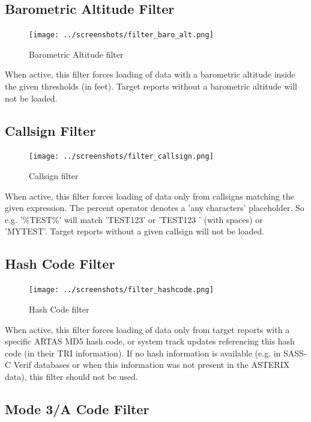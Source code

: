 \subsection{Barometric Altitude Filter}

\begin{figure}[H]
  \center
    \texttt{[image: ../screenshots/filter\_baro\_alt.png]}
  \caption{Barometric Altitude filter}
\end{figure}

When active, this filter forces loading of data with a barometric altitude inside the given thresholds (in feet). Target reports without a barometric altitude will not be loaded.

\subsection{Callsign Filter}

\begin{figure}[H]
  \center
    \texttt{[image: ../screenshots/filter\_callsign.png]}
  \caption{Callsign filter}
\end{figure}

When active, this filter forces loading of data only from callsigns matching the given expression. The percent operator denotes a 'any characters' placeholder. So e.g. '\%TEST\%' will match 'TEST123' or 'TEST123   ' (with spaces) or 'MYTEST'. Target reports without a given callsign will not be loaded.

\subsection{Hash Code Filter}

\begin{figure}[H]
  \center
    \texttt{[image: ../screenshots/filter\_hashcode.png]}
  \caption{Hash Code filter}
\end{figure}

When active, this filter forces loading of data only from target reports with a specific ARTAS MD5 hash code, or system track updates referencing this hash code (in their TRI information). If no hash information is available (e.g. in SASS-C Verif databases or when this information was not present in the ASTERIX data), this filter should not be used.

\subsection{Mode 3/A Code Filter}


